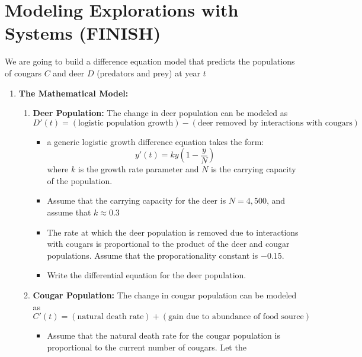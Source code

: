\newpage\section{Modeling Explorations with Systems (FINISH)}
\begin{problem}
We are going to build a difference equation model that predicts the populations of cougars
$C$ and deer $D$ (predators and prey) at year $t$
\begin{enumerate}
    \item {\bf The Mathematical Model:} 
        \begin{enumerate}
            \item {\bf Deer Population:} The change in deer population can be modeled as 
                \[ D'(t) = (\text{logistic population growth}) - (\text{deer removed
                by interactions with cougars}) \]
                \begin{itemize}
                    \item a generic logistic growth difference equation takes the form: 
                        \[ y'(t) = k y \left(1-\frac{y}{N}\right) \]
                        where $k$ is the growth rate parameter and
                        $N$ is the carrying capacity of the population.
                    \item Assume that the carrying capacity for the deer is $N = 4,500$,
                        and assume that $k \approx 0.3$
                    \item The rate at which the deer population is removed due to
                        interactions with cougars is proportional to the product of the
                        deer and cougar populations.  Assume that the proporationality
                        constant is $-0.15$.
                    \item Write the differential equation for the deer population. 
                \end{itemize}
            \item {\bf Cougar Population:} The change in cougar population can be modeled
                as
                \[ C'(t) = \left( \text{natural death rate} \right) + \left(
                    \text{gain due to abundance of food source}
                \right) \]
                \begin{itemize}
                    \item Assume that the natural death rate for the cougar population is
                        proportional to the current number of cougars.  Let the

\end{itemize}
\end{enumerate}
\end{enumerate}
\end{problem}
